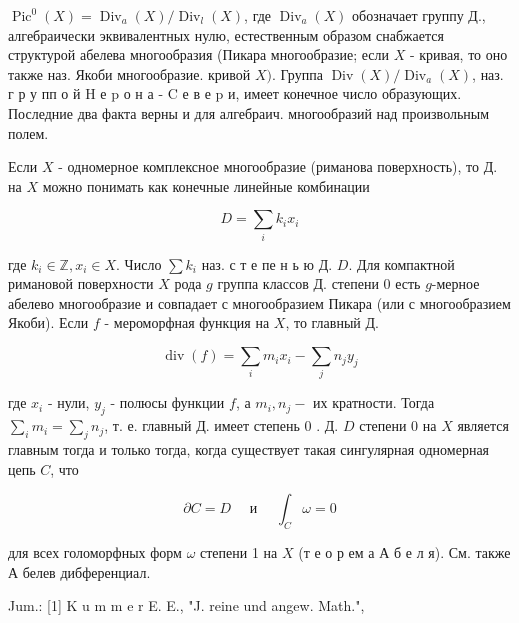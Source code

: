 \documentclass[10pt]{article}
\begin{document}
$\operatorname{Pic}^{0}(X)=\operatorname{Div}_{a}(X) / \operatorname{Div}_{l}(X)$, где $\operatorname{Div}_{a}(X)$ обозначает группу Д., алгебраически эквивалентных нулю, естественным образом снабжается структурой абелева многообразия (Пикара многообразие; если $X$ - кривая, то оно также наз. Якоби многообразие. кривой $X)$. Группа $\operatorname{Div}(X) / \operatorname{Div}_{a}(X)$, наз. г р у пп о й $\mathrm{H}$ е $\mathrm{p}$ о н а - $\mathrm{C}$ е в е $\mathrm{p}$ и, имеет конечное число образующих. Последние два факта верны и для алгебраич. многообразий над произвольным полем.



Если $X$ - одномерное комплексное многообразие (риманова поверхность), то Д. на $X$ можно понимать как конечные линейные комбинации



\[

D=\sum_{i} k_{i} x_{i}

\]



где $k_{i} \in \mathbb{Z}, x_{i} \in X$. Число $\sum k_{i}$ наз. с т е пе н ь ю Д. $D$. Для компактной римановой поверхности $X$ рода $g$ группа классов Д. степени 0 есть $g$-мерное абелево многообразие и совпадает с многообразием Пикара (или с многообразием Якоби). Если $f$ - мероморфная функция на $X$, то главный Д.



\[

\operatorname{div}(f)=\sum_{i} m_{i} x_{i}-\sum_{j} n_{j} y_{j}

\]



где $x_{i}$ - нули, $y_{j}$ - полюсы функции $f$, а $m_{i}, n_{j}-$ их кратности. Тогда $\sum_{i} m_{i}=\sum_{j} n_{j}$, т. е. главный Д. имеет степень 0 . Д. $D$ степени 0 на $X$ является главным тогда и только тогда, когда существует такая сингулярная одномерная цепь $C$, что



\[

\partial C=D \quad \text { и } \quad \int_{C} \omega=0

\]



для всех голоморфных форм $\omega$ степени 1 на $X$ (т е о р ем а А б е л я). См. также А белев дибференциал.



Jum.: [1] K u m m e r E. E., "J. reine und angew. Math.",
\end{document}

